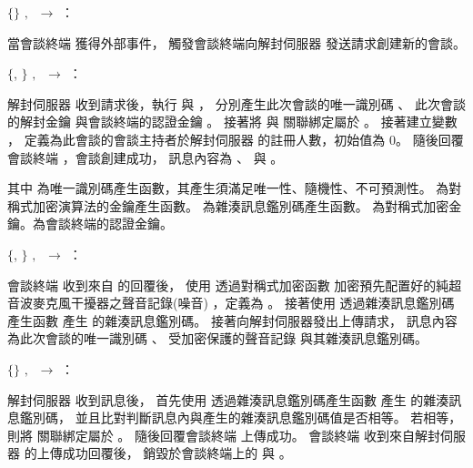 \begin{pmsgs}
    \item $\{\}$ $,~$ \DEFmeetingbox $\rightarrow$ \DEFserver：

        當會談終端 \DEFmeetingbox 獲得外部事件，
    觸發會談終端向解封伺服器 \DEFserver 發送請求創建新的會談。

    \item $\{$\DEFsessionID, \DEFunsealKey$\}$ $,~$ \DEFserver $\rightarrow$ \DEFmeetingbox：

        解封伺服器 \DEFserver 收到請求後，執行 \DEFfuncIDgen{} 與 \DEFfuncKgen{}，
    分別產生此次會談的唯一識別碼 \DEFsessionID、
    此次會談的解封金鑰 \DEFunsealKey 與會談終端的認證金鑰 \DEFmboxKey。
    接著將 \DEFunsealKey 與 \DEFmboxKey 關聯綁定屬於 \DEFsessionID。
    接著建立變數 \DEFowreg，
    定義為此會談的會談主持者於解封伺服器 \DEFserver 的註冊人數，初始值為 $0$。
    隨後回覆會談終端 \DEFmeetingbox，會談創建成功，
    訊息內容為 \DEFsessionID 、 \DEFunsealKey 與 \DEFmboxKey。

        其中 \DEFfuncIDgen{} 為唯一識別碼產生函數，其產生須滿足唯一性、隨機性、不可預測性。
    \DEFfuncKgen{} 為對稱式加密演算法的金鑰產生函數。
    \DEFfuncHMAC{} 為雜湊訊息鑑別碼產生函數。
    \DEFunsealKey 為對稱式加密金鑰。\DEFmboxKey 為會談終端的認證金鑰。

    \item $\{$\DEFsessionID, \DEFrecP$\}$ $,~$ \DEFmeetingbox $\rightarrow$ \DEFserver：

        會談終端 \DEFmeetingbox 收到來自 \DEFserver 的回覆後，
    使用 \DEFunsealKey 透過對稱式加密函數 \DEFfuncEncEK{}
    加密預先配置好的純超音波麥克風干擾器之聲音記錄(噪音) \DEFrecN，定義為 \DEFrecP。
    接著使用 \DEFmboxKey 透過雜湊訊息鑑別碼產生函數 \DEFfuncHMAC{}
    產生 \DEFrecP 的雜湊訊息鑑別碼。
    接著向解封伺服器發出上傳請求，
    訊息內容為此次會談的唯一識別碼 \DEFsessionID 、
    受加密保護的聲音記錄 \DEFrecP 與其雜湊訊息鑑別碼。

    \item $\{\}$ $,~$ \DEFserver $\rightarrow$ \DEFmeetingbox：

        解封伺服器 \DEFserver 收到訊息後，
    首先使用 \DEFmboxKey 透過雜湊訊息鑑別碼產生函數 \DEFfuncHMAC{} 產生 \DEFrecP 的雜湊訊息鑑別碼，
    並且比對判斷訊息內與產生的雜湊訊息鑑別碼值是否相等。
    若相等，則將 \DEFrecP 關聯綁定屬於 \DEFsessionID。
    隨後回覆會談終端 \DEFmeetingbox 上傳成功。
    會談終端 \DEFmeetingbox 收到來自解封伺服器 \DEFserver 的上傳成功回覆後，
    銷毀於會談終端上的 \DEFrecN 與 \DEFunsealKey。
\end{pmsgs}



